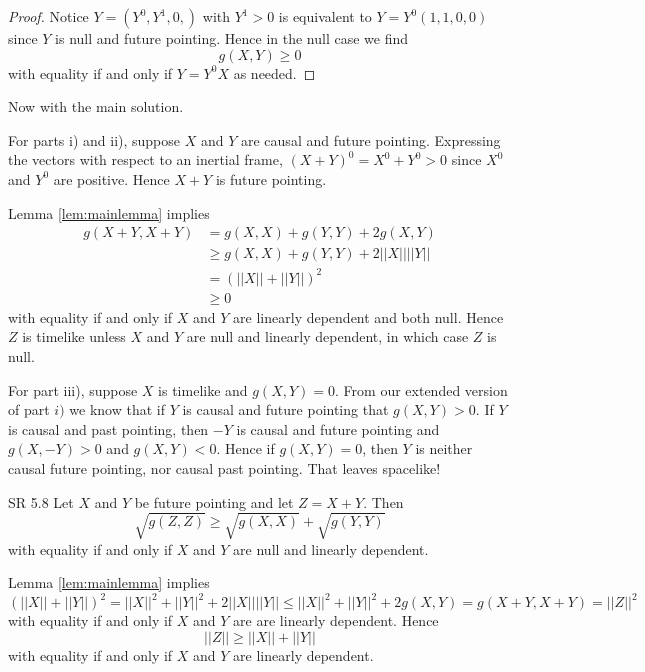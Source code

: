 \documentclass[minion]{homework}
\begin{document}
\begin{aproblems}
\begin{proof}
Notice $Y=(Y^0,Y^1,0,)$ with $Y^1>0$ is equivalent to  $Y = Y^0(1,1,0,0)$
since $Y$ is null and future pointing.  Hence in the null case we find
\begin{equation}
g(X,Y)\ge 0
\end{equation}
with equality if and only if $Y=Y^0 X$ as needed.
\end{proof}

Now with the main solution.

For parts i) and ii), suppose $X$ and $Y$ are causal and future pointing.
Expressing the vectors with respect to an inertial frame, $(X+Y)^0=X^0+Y^0>0$
since $X^0$ and $Y^0$ are positive.  Hence $X+Y$ is future pointing.

Lemma \ref{lem:mainlemma} implies
\begin{equation}
\begin{aligned}
g(X+Y,X+Y) &= g(X,X) + g(Y,Y) + 2g(X,Y) \\
&\ge g(X,X) + g(Y,Y) + 2||X||||Y|| \\
&= (||X||+||Y||)^2 \\
&\ge 0
\end{aligned}
\end{equation}
with equality if and only if $X$ and $Y$ are linearly dependent and both null. Hence
$Z$ is timelike unless $X$ and $Y$ are null and linearly dependent, in which case $Z$ is null.

For part iii), suppose $X$ is timelike and $g(X,Y)=0$.  From our extended version
of part $i)$ we know that if $Y$ is causal and future pointing that $g(X,Y)>0$.
If $Y$ is causal and past pointing, then $-Y$ is causal and future pointing
and $g(X,-Y)>0$ and $g(X,Y)<0$.  Hence if $g(X,Y)=0$, then $Y$ is neither causal
future pointing, nor causal past pointing.  That leaves spacelike!



\hproblem SR 5.8
Let $X$ and $Y$ be future pointing and let $Z= X+Y$.  Then
\begin{equation}
\sqrt{g(Z,Z)} \ge \sqrt{g(X,X)} + \sqrt{g(Y,Y)}
\end{equation}
with equality if and only if $X$ and $Y$ are null and linearly dependent.

\solution
Lemma \ref{lem:mainlemma} implies
\begin{equation}
(||X||+||Y||)^2 = ||X||^2 + ||Y||^2 + 2||X||||Y|| \le ||X||^2 + ||Y||^2 + 2 g(X,Y) = g(X+Y,X+Y) = ||Z||^2
\end{equation}
with equality if and only if $X$ and $Y$ are are linearly dependent.
Hence
\begin{equation}
||Z|| \ge ||X||+||Y||
\end{equation}
with equality if and only if $X$ and $Y$ are linearly dependent.


\end{aproblems}
\end{document}
